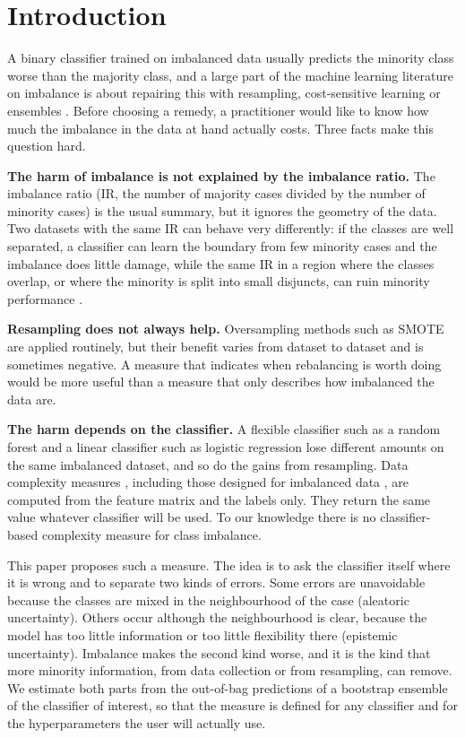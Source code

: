 \documentclass[preprint,12pt]{elsarticle}
\newcommand{\IR}{\mathrm{IR}}
\begin{document}
\section{Introduction}\label{sec:intro}
A binary classifier trained on imbalanced data usually predicts the minority class worse than the majority class, and a large part of the machine learning literature on imbalance is about repairing this with resampling, cost-sensitive learning or ensembles \cite{He2009,Fernandez2018}. Before choosing a remedy, a practitioner would like to know how much the imbalance in the data at hand actually costs. Three facts make this question hard.

\textbf{The harm of imbalance is not explained by the imbalance ratio.} The imbalance ratio ($\IR$, the number of majority cases divided by the number of minority cases) is the usual summary, but it ignores the geometry of the data. Two datasets with the same $\IR$ can behave very differently: if the classes are well separated, a classifier can learn the boundary from few minority cases and the imbalance does little damage, while the same $\IR$ in a region where the classes overlap, or where the minority is split into small disjuncts, can ruin minority performance \cite{Japkowicz2002,Prati2004,Lopez2013,Santos2022}.

\textbf{Resampling does not always help.} Oversampling methods such as SMOTE \cite{Chawla2002} are applied routinely, but their benefit varies from dataset to dataset and is sometimes negative. A measure that indicates when rebalancing is worth doing would be more useful than a measure that only describes how imbalanced the data are.

\textbf{The harm depends on the classifier.} A flexible classifier such as a random forest and a linear classifier such as logistic regression lose different amounts on the same imbalanced dataset, and so do the gains from resampling. Data complexity measures \cite{Ho2002,Lorena2019}, including those designed for imbalanced data \cite{Barella2021,Napierala2016}, are computed from the feature matrix and the labels only. They return the same value whatever classifier will be used. To our knowledge there is no classifier-based complexity measure for class imbalance.

This paper proposes such a measure. The idea is to ask the classifier itself where it is wrong and to separate two kinds of errors. Some errors are unavoidable because the classes are mixed in the neighbourhood of the case (aleatoric uncertainty). Others occur although the neighbourhood is clear, because the model has too little information or too little flexibility there (epistemic uncertainty). Imbalance makes the second kind worse, and it is the kind that more minority information, from data collection or from resampling, can remove. We estimate both parts from the out-of-bag predictions of a bootstrap ensemble of the classifier of interest, so that the measure is defined for any classifier and for the hyperparameters the user will actually use.
\end{document}
